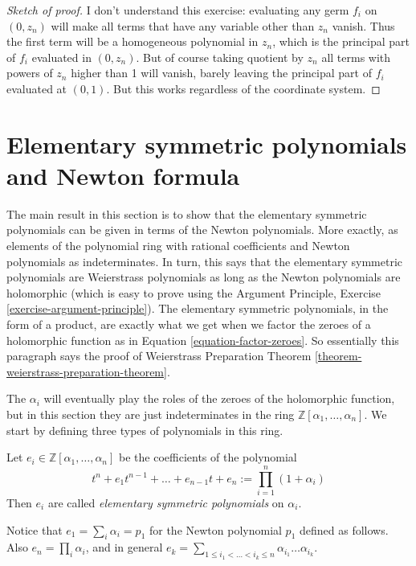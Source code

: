 \begin{proof}[Sketch of proof]
I don't understand this exercise: evaluating any germ $f_i$ on $(0,z_n)$ will
make all terms that have any variable other than $z_n$ vanish. Thus the first
term will be a homogeneous polynomial in $z_n$, which is the principal part of
$f_i$ evaluated in $(0,z_n)$. But of course taking quotient by $z_n$ all terms
with powers of $z_n$ higher than 1 will vanish, barely leaving the principal
part of $f_i$ evaluated at $(0,1)$. But this works regardless of the coordinate
system.
\end{proof}

\section{Elementary symmetric polynomials and Newton formula}
\label{section-elementary-symmetric-polynomials-and-Newton-formula}

\noindent
The main result in this section
is to show that the elementary symmetric polynomials
can be given in terms of the Newton polynomials.
More exactly, as elements of the polynomial
ring with rational coefficients and Newton polynomials
as indeterminates.
In turn, this says that the elementary symmetric polynomials
are Weierstrass polynomials as long as the Newton polynomials
are holomorphic (which is easy to prove using the Argument Principle,
Exercise \ref{exercise-argument-principle}).
The elementary symmetric polynomials, in the form of a product,
are exactly what we get when we factor the zeroes
of a holomorphic function as in Equation \ref{equation-factor-zeroes}.
So essentially this paragraph says the proof of 
Weierstrass Preparation Theorem \ref{theorem-weierstrass-preparation-theorem}.

\medskip\noindent
The $\alpha_i$ will eventually play the roles of the zeroes
of the holomorphic function, but in this section they are just
indeterminates in the ring $\mathbb{Z}[\alpha_1,\ldots,\alpha_n]$.
We start by defining three types of polynomials in this ring.

\begin{definition}
\label{definition-symmetric-polynomial}
Let $e_i \in \mathbb{Z}[\alpha_1,\ldots,\alpha_n]$ be the coefficients of the
polynomial 
$$
t^n+e_1t^{n-1}+\ldots+e_{n-1}t+e_n:=\prod_{i=1}^n(1+\alpha_i)
$$ Then $e_i$ are called {\it elementary
symmetric polynomials} on $\alpha_i$.
\end{definition}

\noindent
Notice that $e_1=\sum_i\alpha_i=p_1$ for the Newton polynomial $p_1$ defined as
follows. Also $e_n=\prod_{i}\alpha_i$, and in general $e_k=\sum_{1\leq
i_1<\ldots<i_k\leq n}\alpha_{i_1}\ldots\alpha_{i_k}$.

